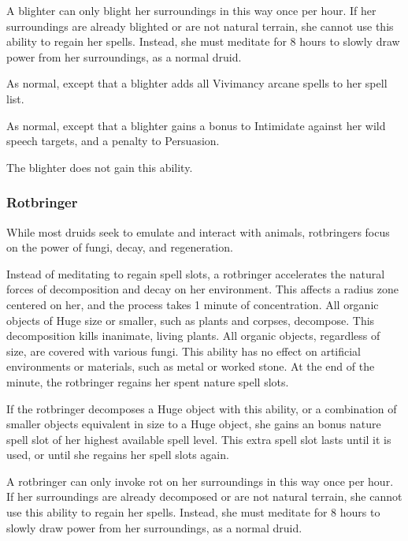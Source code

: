             A blighter can only blight her surroundings in this way once per hour.
            If her surroundings are already blighted or are not natural terrain, she cannot use this ability to regain her spells.
            Instead, she must meditate for 8 hours to slowly draw power from her surroundings, as a normal druid.

             As normal, except that a blighter adds all Vivimancy arcane spells to her spell list.

             As normal, except that a blighter gains a  bonus to Intimidate against her wild speech targets, and a  penalty to Persuasion.

             The blighter does not gain this ability.



        \subsubsection{Rotbringer}

            While most druids seek to emulate and interact with animals, rotbringers focus on the power of fungi, decay, and regeneration.

             Instead of meditating to regain spell slots, a rotbringer accelerates the natural forces of decomposition and decay on her environment.
            This affects a \areahuge radius zone centered on her, and the process takes 1 minute of concentration.
            All organic objects of Huge size or smaller, such as plants and corpses, decompose.
            This decomposition kills inanimate, living plants.
            All organic objects, regardless of size, are covered with various fungi.
            This ability has no effect on artificial environments or materials, such as metal or worked stone.
            At the end of the minute, the rotbringer regains her spent nature spell slots.

            If the rotbringer decomposes a Huge object with this ability, or a combination of smaller objects equivalent in size to a Huge object, she gains an bonus nature spell slot of her highest available spell level.
            This extra spell slot lasts until it is used, or until she regains her spell slots again.

            A rotbringer can only invoke rot on her surroundings in this way once per hour.
            If her surroundings are already decomposed or are not natural terrain, she cannot use this ability to regain her spells.
            Instead, she must meditate for 8 hours to slowly draw power from her surroundings, as a normal druid.

